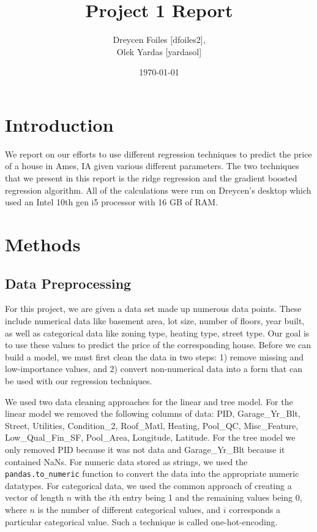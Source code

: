 \documentclass{article}
\title{Project 1 Report}
\author{Dreycen Foiles [dfoiles2], \\ Olek Yardas [yardasol]}
\date{\today}
\begin{document}
\maketitle

\section{Introduction}

We report on our efforts to use different regression techniques to predict the price of a house in Ames, IA given various different parameters. The two techniques that we present in this report is the ridge regression and the gradient boosted regression algorithm. All of the calculations were run on Dreycen's desktop which used an Intel 10th gen i5 processor with 16 GB of RAM. 

\section{Methods}

\subsection{Data Preprocessing}
For this project, we are given a data set made up numerous data points. These
include numerical data like basement area,  lot size, number of floors, year
built, as well as categorical data like zoning type, heating type, street type.
Our goal is to use these values to predict the price of the corresponding house.
Before we can build a model, we must first clean the data in two steps:
1) remove missing and low-importance values, and 2) convert non-numerical data
into a form that can be used with our regression techniques. 

We used two data cleaning approaches for the linear and tree model. For the linear model 
we removed the following columns of data:
PID, Garage\_Yr\_Blt, Street, Utilities, Condition\_2, Roof\_Matl, Heating,
Pool\_QC, Misc\_Feature, \\ 
Low\_Qual\_Fin\_SF, Pool\_Area, Longitude, Latitude. For the 
tree model we only removed PID because it was not data and Garage\_Yr\_Blt because 
it contained NaNs. For numeric data stored as strings, we used the \verb,pandas.to_numeric, 
function to convert the data into the appropriate numeric datatypes. For
categorical data, we used the common approach of creating a vector of length
$n$ with the $i$th entry being 1 and the remaining values being 0, where $n$ is
the number of different categorical values, and $i$ corresponds a particular
categorical value. Such a technique is called one-hot-encoding. 
\end{document}
